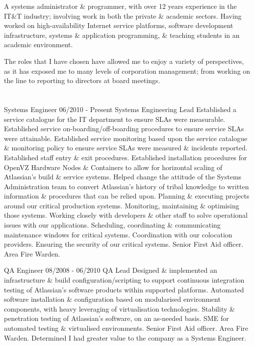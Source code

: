 
A {\mb systems administrator} \& {\mb programmer}, with over 12 years experience in the IT\&T industry; involving work in both the private \& academic sectors. Having worked on high-availability Internet service platforms, software development infrastructure, systems \& application programming, \& teaching students in an academic environment.

The roles that I have chosen have allowed me to enjoy a variety of perspectives, as it has exposed me to many levels of corporation management; from working on the line to reporting to directors at board meetings.


\section{\ATL}

\lskip
{} Systems Engineer
 06/2010 - Present
 Systems Engineering Lead
 Established a service catalogue for the IT department to ensure SLAs were measurable.
\dashtopic Established service on-boarding/off-boarding procedures to ensure service SLAs were attainable.
\dashtopic Established service monitoring based upon the service catalogue \& monitoring policy to ensure service SLAs were measured \& incidents reported.
\dashtopic Established staff entry \& exit procedures.
\dashtopic Established installation procedures for OpenVZ Hardware Nodes \& Containers to allow for horizontal scaling of Atlassian's build \& service systems.
\dashtopic Helped change the attitude of the Systems Administration team to convert Atlassian's history of tribal knowledge to written information \& procedures that can be relied upon.
 Planning \& executing projects around our critical production systems.
\dashtopic Monitoring, maintaining \& optimising those systems.
\dashtopic Working closely with developers \& other staff to solve operational issues with our applications.
\dashtopic Scheduling, coordinating \& communicating maintenance windows for critical systems.
\dashtopic Coordination with our colocation providers.
\dashtopic Ensuring the security of our critical systems.
\dashtopic Senior First Aid officer.
\dashtopic Area Fire Warden.
\pskip

 QA Engineer
\lskip
{} 08/2008 - 06/2010
 QA Lead
 Designed \& implemented an infrastructure \& build configuration/scripting to support continuous integration testing of Atlassian's software products within supported platforms. Automated software installation \& configuration based on modularised environment components, with heavy leveraging of virtualisation technologies.
 Stability \& penetration testing of Atlassian's software, on an as-needed basis.
\dashtopic SME for automated testing \& virtualised environments.
\dashtopic Senior First Aid officer.
\dashtopic Area Fire Warden.
 Determined I had greater value to the company as a Systems Engineer.


